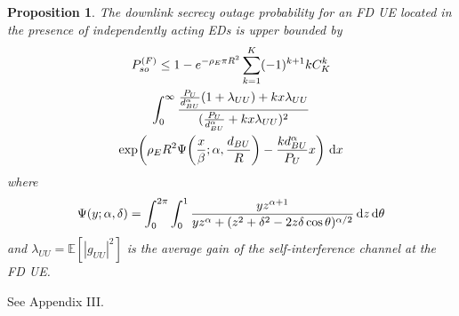 \documentclass[10pt]{IEEEtran}
\newcommand{\rmd}{\,{\rm d}}
\newtheorem{prop}[thm]{Proposition}
\begin{document}
\begin{prop}\label{prop2}
  The downlink secrecy outage probability for an FD UE located in the presence of independently acting EDs  is upper bounded by
\begin{multline}\label{141}
  P^{(F)}_{so} \leq 1-e^{-\rho_E\pi R^2} \sum^K_{k=1}(-1)^{k+1}kC^k_K \\
  \int_0^\infty \frac{\frac{P_U}{d^\alpha_{BU}}(1+\lambda_{UU})+kx\lambda_{UU}}{(\frac{P_U}{d^\alpha_{BU}}+kx\lambda_{UU})^2} \\
  \exp\!\left(\rho_E R^2 \Psi\!\left(\frac{x}{\beta};\alpha,\frac{d_{BU}}{R}\right)-\frac{kd^\alpha_{BU}}{P_U}x\right)\,{\rm d}x
\end{multline}
where
\begin{equation}
  \Psi(y;\alpha,\delta) = \int^{2\pi}_0\int^{1}_0 \frac{yz^{\alpha+1}}{yz^\alpha+({z^2+\delta^2-2z\delta\cos\theta})^{\alpha/2}} \rmd z \rmd \theta
\end{equation}
and $\lambda_{UU} = \mathbb E[|g_{UU}|^2]$ is the average gain of the self-interference channel at the FD UE.
\end{prop}
\begin{IEEEproof}
  See Appendix III.
\end{IEEEproof}

\end{document}
